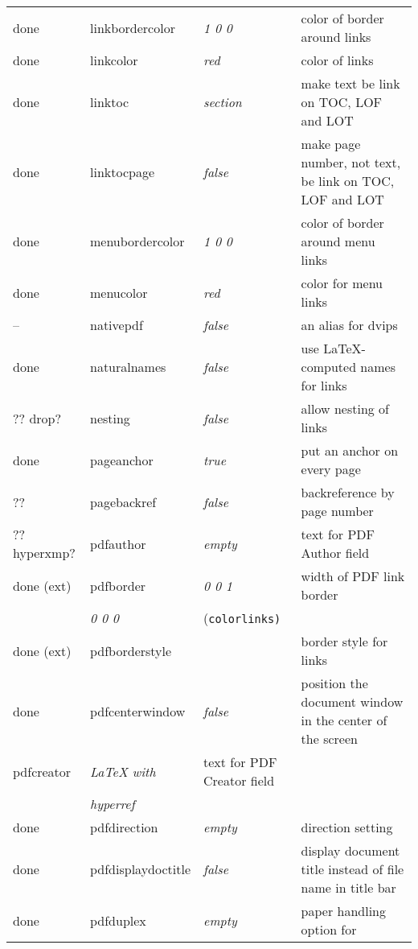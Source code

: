 \begin{longtable}{@{}l>{\ttfamily}llp{7cm}@{}}
done & linkbordercolor    & \textit{1 0 0}         & color of border around links \\
done & linkcolor          & \textit{red}           & color of links \\
done &linktoc            & \textit{section}       & make text be link on TOC, LOF and LOT \\
done & linktocpage        & \textit{false}         & make page number, not text, be link on TOC, LOF and LOT \\
done & menubordercolor    & \textit{1 0 0}         & color of border around menu links \\
done & menucolor          & \textit{red}           & color for menu links \\
-- & nativepdf          & \textit{false}         & an alias for \textsf{dvips} \\
done & naturalnames       & \textit{false}         & use \LaTeX-computed names for links \\
?? drop? & nesting            & \textit{false}         & allow nesting of links \\
done & pageanchor         & \textit{true}          & put an anchor on every page \\
?? & pagebackref        & \textit{false}         & backreference by page number \\
?? hyperxmp? & pdfauthor          & \textit{empty}         & text for PDF Author field \\
done (ext) & pdfborder          & \textit{0 0 1}         & width of PDF link border \\
                   & \textit{0 0 0}         & (\texttt{colorlinks)} \\
done (ext) & pdfborderstyle     &                        & border style for links \\
done & pdfcenterwindow    & \textit{false}         & position the document window in the center of the screen \\
pdfcreator         & \textit{LaTeX with}    & text for PDF Creator field \\
                   & \textit{hyperref}      & \\
done &pdfdirection       & \textit{empty}         & direction setting \\
done &pdfdisplaydoctitle & \textit{false}         & display document title instead
                                              of file name in title bar\\
done &pdfduplex          & \textit{empty}         & paper handling option for

\end{longtable}
